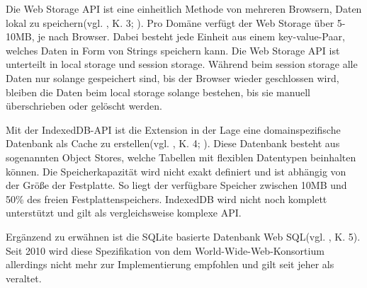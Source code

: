 Die Web Storage API ist eine einheitlich Methode von mehreren Browsern, Daten lokal zu speichern(vgl. \cite{local}, K. 3; \cite{webStorage}). Pro Domäne verfügt der Web Storage über 5-10MB, je nach Browser. Dabei besteht jede Einheit aus einem key-value-Paar, welches Daten in Form von Strings speichern kann. Die Web Storage API ist unterteilt in \glqq local storage\grqq{} und \glqq session storage\grqq{}. Während beim session storage alle Daten nur solange gespeichert sind, bis der Browser wieder geschlossen wird, bleiben die Daten beim local storage solange bestehen, bis sie manuell überschrieben oder gelöscht werden.

Mit der IndexedDB-API ist die Extension in der Lage eine domainspezifische Datenbank als Cache zu erstellen(vgl. \cite{local}, K. 4; \cite{indexed}). Diese Datenbank besteht aus sogenannten \glqq Object Stores\grqq{}, welche Tabellen mit flexiblen Datentypen beinhalten können. Die Speicherkapazität wird nicht exakt definiert und ist abhängig von der Größe der Festplatte\cite{limit}. So liegt der verfügbare Speicher zwischen 10MB und 50\% des freien Festplattenspeichers. IndexedDB wird nicht noch komplett unterstützt und gilt als vergleichsweise komplexe API.

Ergänzend zu erwähnen ist die SQLite basierte Datenbank Web SQL(vgl. \cite{local}, K. 5). Seit 2010 wird diese Spezifikation von dem World-Wide-Web-Konsortium allerdings nicht mehr zur Implementierung empfohlen und gilt seit jeher als veraltet.
















